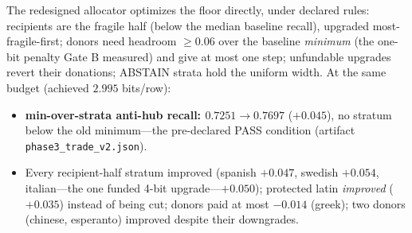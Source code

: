 \documentclass[sigconf, nonacm]{acmart}
\begin{document}
The redesigned allocator optimizes the floor directly, under declared
rules: recipients are the fragile half (below the median baseline recall),
upgraded most-fragile-first; donors need headroom $\ge 0.06$ over the
baseline \emph{minimum} (the one-bit penalty Gate B measured) and give at
most one step; unfundable upgrades revert their donations; ABSTAIN strata
hold the uniform width. At the same budget (achieved $2.995$ bits/row):

\begin{itemize}
\item \textbf{min-over-strata anti-hub recall: $0.7251 \to 0.7697$}
($+0.045$), no stratum below the old minimum---the pre-declared PASS
condition (artifact \texttt{phase3\_trade\_v2.json}).
\item Every recipient-half stratum improved (spanish $+0.047$, swedish
$+0.054$, italian---the one funded 4-bit upgrade---$+0.050$); protected
latin \emph{improved} ($+0.035$) instead of being cut; donors paid at most
$-0.014$ (greek); two donors (chinese, esperanto) improved despite their
downgrades.
\end{itemize}
\end{document}
